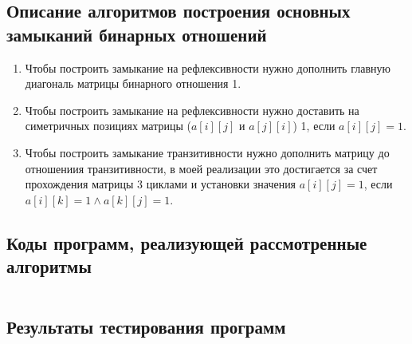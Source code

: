 \documentclass[spec, och, labwork]{shiza}
\begin{document}
        \subsection{Описание алгоритмов построения основных замыканий бинарных отношений}
            \begin{enumerate}
                \item Чтобы построить замыкание на рефлексивности нужно дополнить главную диагональ матрицы бинарного
                отношения 1. 
                \item Чтобы построить замыкание на рефлексивности нужно доставить на симетричных позициях матрицы 
                ($a[i][j]$ и $a[j][i]$) 1, если $a[i][j] = 1$.
                \item Чтобы построить замыкание транзитивности нужно дополнить матрицу до отношениия транзитивности, в моей
                реализации это достигается за счет прохождения матрицы 3 циклами и установки значения $a[i][j] = 1$, если
                $a[i][k] = 1 \wedge a[k][j] = 1$.
            \end{enumerate}
    
        \subsection{Коды программ, реализующей рассмотренные алгоритмы}

            \inputminted[fontsize=\small]{python}{../code/lab1.py}
    
        \subsection{Результаты тестирования программ}
\end{document}
